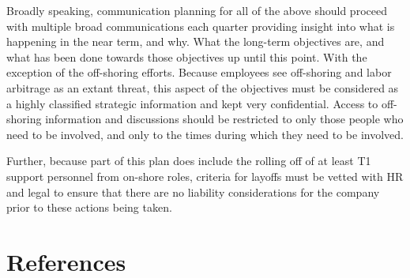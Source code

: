 \documentclass[stu]{apa7}
\begin{document}
Broadly speaking, communication planning for all of the above should proceed with multiple broad communications each quarter providing insight into what is happening in the near term, and why. What the long-term objectives are, and what has been done towards those objectives up until this point. With the exception of the off-shoring efforts. Because employees see off-shoring and labor arbitrage as an extant threat, this aspect of the objectives must be considered as a highly classified strategic information and kept very confidential. Access to off-shoring information and discussions should be restricted to only those people who need to be involved, and only to the times during which they need to be involved.

Further, because part of this plan does include the rolling off of at least T1 support personnel from on-shore roles, criteria for layoffs must be vetted with HR and legal to ensure that there are no liability considerations for the company prior to these actions being taken.

\newpage
\section*{References}
\label{sec:org01e6ae2}
\printbibliography[heading=none]


\newpage
\end{document}
